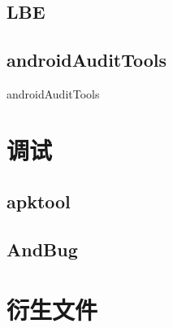 \subsection{LBE}
\subsection{androidAuditTools}
androidAuditTools\cite{url:androidaudittools}

\section{调试}
\label{Sec:debug}
\subsection{apktool}
\subsection{AndBug}

\section{衍生文件}
